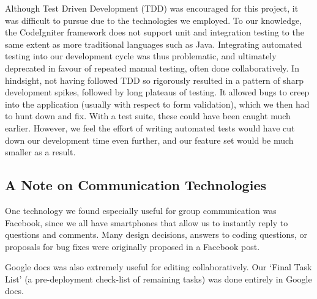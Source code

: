 \documentclass[12pt]{article}
\begin{document}
Although Test Driven Development (TDD) was encouraged for this project, it was difficult to pursue
due to the technologies we employed. To our knowledge, the CodeIgniter framework does not support
unit and integration testing to the same extent as more traditional languages such as Java.
Integrating automated testing into our development cycle was thus problematic, and ultimately
deprecated in favour of repeated manual testing, often done collaboratively. In hindsight,
not having followed TDD so rigorously resulted in a pattern of sharp development spikes, followed by
long plateaus of testing. It allowed bugs to creep into the application (usually with respect to
form validation), which we then had to hunt down and fix. With a test suite, these could
have been caught much earlier. However, we feel the effort of writing automated tests would have cut
down our development time even further, and our feature set would be much smaller as a result.


\subsection{A Note on Communication Technologies}

One technology we found especially useful for group communication was Facebook, since we all have
smartphones that allow us to instantly reply to questions and comments. Many design decisions, 
answers to coding questions, or proposals for bug fixes were originally proposed in a Facebook post.

Google docs was also extremely useful for editing collaboratively. Our `Final Task List' (a
pre-deployment check-list of remaining tasks) was done entirely in Google docs.
\end{document}
